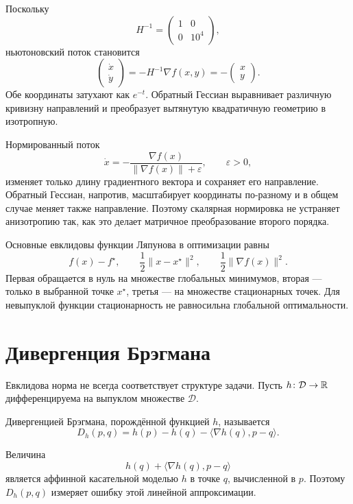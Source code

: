 Поскольку
\[
    H^{-1}
    =
    \begin{pmatrix}
        1&0\\
        0&10^4
    \end{pmatrix},
\]
ньютоновский поток становится
\[
    \begin{pmatrix}
        \dot x\\
        \dot y
    \end{pmatrix}
    =
    -H^{-1}\nabla f(x,y)
    =
    -
    \begin{pmatrix}
        x\\
        y
    \end{pmatrix}.
\]
Обе координаты затухают как \(e^{-t}\). Обратный Гессиан выравнивает
различную кривизну направлений и преобразует вытянутую квадратичную
геометрию в изотропную.

Нормированный поток
\[
    \dot x
    =
    -\frac{\nabla f(x)}
    {\lVert\nabla f(x)\rVert+\varepsilon},
    \qquad
    \varepsilon>0,
\]
изменяет только длину градиентного вектора и сохраняет его
направление. Обратный Гессиан, напротив, масштабирует координаты
по-разному и в общем случае меняет также направление. Поэтому
скалярная нормировка не устраняет анизотропию так, как это делает
матричное преобразование второго порядка.

Основные евклидовы функции Ляпунова в оптимизации равны
\[
    f(x)-f^\star,
    \qquad
    \frac12\lVert x-x^\star\rVert^2,
    \qquad
    \frac12\lVert\nabla f(x)\rVert^2.
\]
Первая обращается в нуль на множестве глобальных минимумов, вторая
— только в выбранной точке \(x^\star\), третья — на множестве
стационарных точек. Для невыпуклой функции стационарность не
равносильна глобальной оптимальности.

\section{Дивергенция Брэгмана}

Евклидова норма не всегда соответствует структуре задачи. Пусть
\(h\colon\mathcal D\to\mathbb{R}\) дифференцируема на выпуклом множестве
\(\mathcal D\).

\begin{definition}
Дивергенцией Брэгмана, порождённой функцией \(h\), называется
\[
    D_h(p,q)
    =
    h(p)-h(q)
    -\langle\nabla h(q),p-q\rangle.
\]
\end{definition}

Величина
\[
    h(q)+\langle\nabla h(q),p-q\rangle
\]
является аффинной касательной моделью \(h\) в точке \(q\),
вычисленной в \(p\). Поэтому \(D_h(p,q)\) измеряет ошибку этой
линейной аппроксимации.

